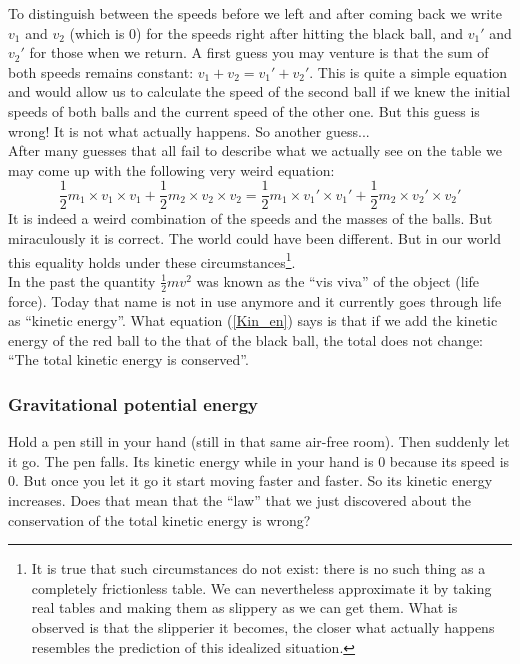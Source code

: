 \noindent To distinguish between the speeds before we left and after coming back we write $v_1$ and $v_2$ (which is 0) for the speeds right after hitting the black ball, and $v_1'$ and $v_2'$ for those when we return. A first guess you may venture is that the sum of both speeds remains constant: $v_1 + v_2 = v_1' + v_2'$. This is quite a simple equation and would allow us to calculate the speed of the second ball if we knew the initial speeds of both balls and the current speed of the other one. But this guess is wrong! It is not what actually happens. So another guess...\\

\noindent After many guesses that all fail to describe what we actually see on the table we may come up with the following very weird equation:
\begin{equation}
\label{Kin_en}
\frac{1}{2} m_1 \times v_1 \times v_1 + \frac{1}{2} m_2 \times v_2 \times v_2 = \frac{1}{2} m_1 \times v_1' \times v_1' + \frac{1}{2} m_2 \times v_2' \times v_2'   
\end{equation}
It is indeed a weird combination of the speeds and the masses of the balls. But miraculously it is correct. The world could have been different. But in our world this equality holds under these circumstances\footnote{It is true that such circumstances do not exist: there is no such thing as a completely frictionless table. We can nevertheless approximate it by taking real tables and making them as slippery as we can get them. What is observed is that the slipperier it becomes, the closer what actually happens resembles the prediction of this idealized situation.}.\\

\noindent In the past the quantity $\frac{1}{2} m v^2$ was known as the "`vis viva"' of the object (life force). Today that name is not in use anymore and it currently goes through life as "`kinetic energy"'. What equation (\ref{Kin_en}) says is that if we add the kinetic energy of the red ball to the that of the black ball, the total does not change: "`The total kinetic energy is conserved"'.

\subsubsection{Gravitational potential energy}
\label{Grav_pot_en_sect}
\noindent Hold a pen still in your hand (still in that same air-free room). Then suddenly let it go. The pen falls. Its kinetic energy while in your hand is 0 because its speed is 0. But once you let it go it start moving faster and faster. So its kinetic energy increases. Does that mean that the "`law"' that we just discovered about the conservation of the total kinetic energy is wrong?\\

